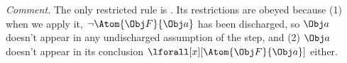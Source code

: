 \documentclass[../../../../include/open-logic-section]{subfiles}
\begin{document}
\begin{prob}
\begin{ans}
\begin{enumerate}
    \emph{Comment.} The only restricted rule is \Intro{\lforall}.
    Its restrictions are obeyed because (1) when we apply it, 
    $\lnot \Atom{\Obj F}{\Obj a}$ has been discharged, so $\Obj a$
    doesn't appear in any undischarged assumption of the \Intro{\lforall}
    step, and (2) $\Obj a$ doesn't appear in its conclusion
     $\lforall[x][\Atom{\Obj F}{\Obj a}]$ either.

\end{enumerate}
\end{ans}
\end{prob}
\end{document}
